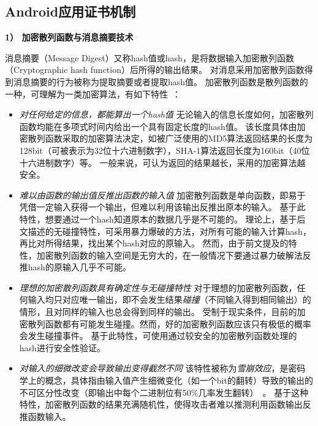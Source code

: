 \subsection{Android应用证书机制}
\label{sec:signature}

\textbf{1） 加密散列函数与消息摘要技术}

消息摘要（Message Digest）又称hash值或hash，是将数据输入加密散列函数（Cryptographic hash function）后所得的输出结果。
对消息采用加密散列函数得到消息摘要的行为被称为提取摘要或者提取hash值。
加密散列函数是散列函数的一种，可理解为一类加密算法，有如下特性~\cite{wiki_encryptographic}：
\begin{itemize}
	\setlength{\itemsep}{1pt}
	      \setlength{\parskip}{0pt}
	      \setlength{\parsep}{0pt}
	\item \emph{对任何给定的信息，都能算出一个hash值} \quad
	      无论输入的信息长度如何，加密散列函数均能在多项式时间内给出一个具有固定长度的hash值。
	      该长度具体由加密散列函数采取的加密算法决定，如被广泛使用的MD5算法返回结果的长度为128bit（可被表示为32位十六进制数字），SHA-1算法返回长度为160bit（40位十六进制数字）等。
	      一般来说，可认为返回的结果越长，采用的加密算法越安全。

	\item \emph{难以由函数的输出值反推出函数的输入值} \quad
	      加密散列函数是单向函数，即易于凭借一定输入获得一个输出，但难以利用该输出反推出原本的输入。
	      基于此特性，想要通过一个hash知道原本的数据几乎是不可能的。
	      理论上，基于后文描述的无碰撞特性，可采用暴力爆破的方法，对所有可能的输入计算hash，再比对所得结果，找出某个hash对应的原输入。
	      然而，由于前文提及的特性，加密散列函数的输入空间是无穷大的，在一般情况下要通过暴力破解法反推hash的原输入几乎不可能。

	\item \emph{理想的加密散列函数具有确定性与无碰撞特性} \quad
	      对于理想的加密散列函数，任何输入均只对应唯一输出，即不会发生结果\textit{碰撞}（不同输入得到相同输出）的情形，且对同样的输入也总会得到同样的输出。
	      受制于现实条件，目前的加密散列函数都有可能发生碰撞。然而，好的加密散列函数应该只有极低的概率会发生碰撞事件。
	      基于此特性，可使用通过较安全的加密散列函数处理的hash进行安全性验证。

	\item \emph{对输入的细微改变会导致输出变得截然不同} \quad
	      该特性被称为\textit{雪崩效应}，是密码学上的概念，具体指由输入值产生细微变化（如一个bit的翻转）导致的输出的不可区分性改变（即输出中每个二进制位有50\%几率发生翻转）~\cite{feistel1973cryptography}。
	      基于这种特性，加密散列函数的结果充满随机性，使得攻击者难以推测利用函数输出反推函数输入。
\end{itemize}

